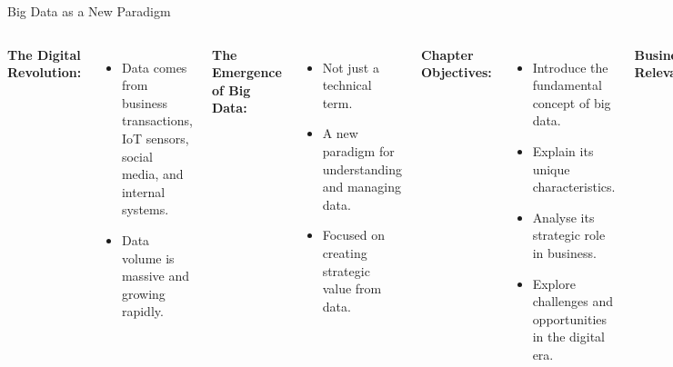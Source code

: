 \documentclass[aspectratio=169, table]{beamer}
\begin{document}
\begin{frame}[fragile]{Big Data as a New Paradigm}
	\vspace{20pt}
	\small
	\begin{columns}[T]
		\textbf{The Digital Revolution:}
		\begin{itemize}
			\item Data comes from business transactions, IoT sensors, social media, and internal systems.
			\item Data volume is massive and growing rapidly.
		\end{itemize}
		
		\textbf{The Emergence of Big Data:}
		\begin{itemize}
			\item Not just a technical term.
			\item A new paradigm for understanding and managing data.
			\item Focused on creating strategic value from data.
		\end{itemize}
		
		\textbf{Chapter Objectives:}
		\begin{itemize}
			\item Introduce the fundamental concept of big data.
			\item Explain its unique characteristics.
			\item Analyse its strategic role in business.
			\item Explore challenges and opportunities in the digital era.
		\end{itemize}
		
		\textbf{Business Relevance:}
		\begin{itemize}
			\item Organisations must be adaptive and data-driven.
			\item Big data is a source of competitive advantage.
		\end{itemize}
	\end{columns}
\end{frame}
\end{document}
